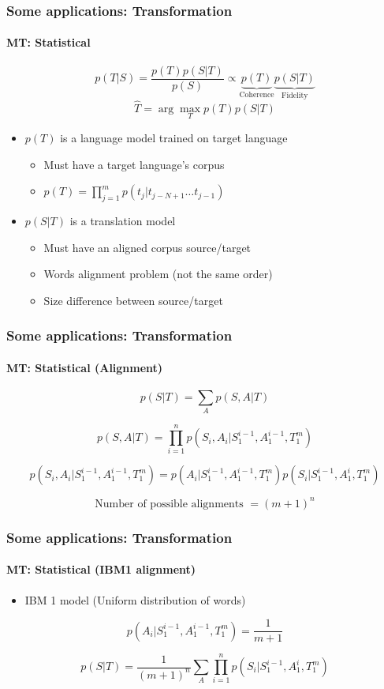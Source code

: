 \documentclass[xcolor=table]{beamer}
\begin{document}
\begin{frame}
	\frametitle{Some applications: Transformation}
	\framesubtitle{MT: Statistical}
	\[
	p(T|S) = \frac{p(T) p(S|T)}{p(S)} \propto \underbrace{p(T)}_\text{Coherence} \underbrace{p(S|T)}_\text{Fidelity}
	\]
	\[\hat{T} = \arg\max_{T} p(T) p(S|T)\]
	\[\]
	\begin{itemize}
		\item $p(T)$ is a language model trained on target language
		\begin{itemize}
			\item Must have a target language's corpus
			\item $p(T) = \prod_{j=1}^m p(t_j|t_{j-N+1}\ldots t_{j-1})$
		\end{itemize}
		
		\item $p(S|T)$ is a translation model 
		\begin{itemize}
			\item Must have an aligned corpus source/target
			\item Words alignment problem (not the same order)
			\item Size difference between source/target
		\end{itemize}
	\end{itemize}
\end{frame}

\begin{frame}
	\frametitle{Some applications: Transformation}
	\framesubtitle{MT: Statistical (Alignment)}
	
	\[p(S|T) = \sum_{A} p(S, A | T)\]
	
	\[p(S, A | T) = \prod_{i=1}^{n} p(S_i, A_i | S_1^{i-1}, A_1^{i-1}, T_1^{m})\]
	
	\[p(S_i, A_i | S_1^{i-1}, A_1^{i-1}, T_1^{m}) = p(A_i | S_1^{i-1}, A_1^{i-1}, T_1^{m}) p(S_i | S_1^{i-1}, A_1^{i}, T_1^{m})\]
	
	\[ \text{Number of possible alignments } = (m + 1)^n\]
\end{frame}

\begin{frame}
	\frametitle{Some applications: Transformation}
	\framesubtitle{MT: Statistical (IBM1 alignment)}
	\begin{itemize}
		\item IBM 1 model (Uniform distribution of words)
	\end{itemize}

	\[p(A_i | S_1^{i-1}, A_1^{i-1}, T_1^{m}) = \frac{1}{m+1}\]
	
	\[p(S|T) = \frac{1}{(m+1)^n} \sum_{A} \prod_{i=1}^{n} p(S_i | S_1^{i-1}, A_1^{i}, T_1^{m})\]
\end{frame}
\end{document}
